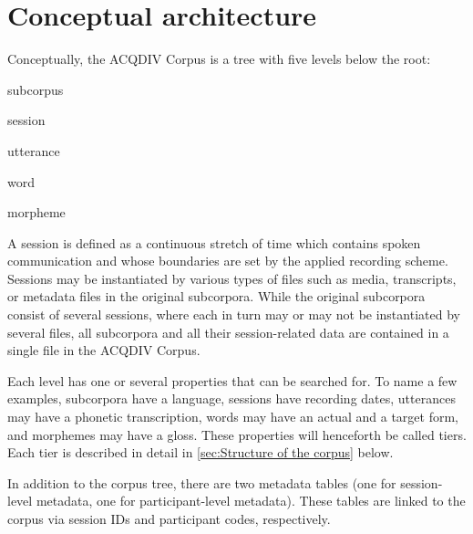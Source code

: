 \documentclass[a4paper, 11pt]{book}
\begin{document}


\section{Conceptual architecture}
\label{sec:Architecture}

Conceptually, the ACQDIV Corpus is a tree with five levels below the root: 

\begin{itemize*}
	\item subcorpus
	\item session
	\item utterance
	\item word 
	\item morpheme
\end{itemize*}

A session is defined as a continuous stretch of time which contains spoken communication and whose boundaries are set by the applied recording scheme. Sessions may be instantiated by various types of files such as media, transcripts, or metadata files in the original subcorpora. While the original subcorpora consist of several sessions, where each in turn may or may not be instantiated by several files, all subcorpora and all their session-related data are contained in a single file in the ACQDIV Corpus. 

Each level has one or several properties that can be searched for. To name a few examples, subcorpora have a language, sessions have recording dates, utterances may have a phonetic transcription, words may have an actual and a target form, and morphemes may have a gloss. These properties will henceforth be called tiers. Each tier is described in detail in \autoref{sec:Structure of the corpus} below. 

In addition to the corpus tree, there are two metadata tables (one for session-level metadata, one for participant-level metadata). These tables are linked to the corpus via session IDs and participant codes, respectively. 
\end{document}
